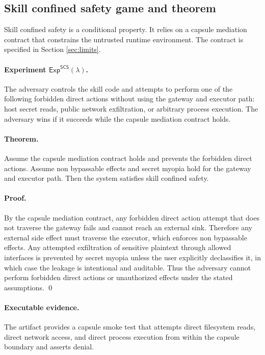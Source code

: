 \subsection{Skill confined safety game and theorem}
\label{app:proofs:scs}

Skill confined safety is a conditional property.
It relies on a capsule mediation contract that constrains the untrusted runtime environment.
The contract is specified in Section \ref{sec:limits}.

\paragraph{Experiment $\mathsf{Exp}^{\mathsf{SCS}}(\lambda)$.}
The adversary controls the skill code and attempts to perform one of the following forbidden direct
actions without using the gateway and executor path:
host secret reads, public network exfiltration, or arbitrary process execution.
The adversary wins if it succeeds while the capsule mediation contract holds.

\paragraph{Theorem.}
\begin{theorem}\label{thm:scs}
Assume the capsule mediation contract holds and prevents the forbidden direct actions.
Assume non bypassable effects and secret myopia hold for the gateway and executor path.
Then the system satisfies skill confined safety.
\end{theorem}

\paragraph{Proof.}
By the capsule mediation contract, any forbidden direct action attempt that does not traverse the
gateway fails and cannot reach an external sink.
Therefore any external side effect must traverse the executor, which enforces non bypassable effects.
Any attempted exfiltration of sensitive plaintext through allowed interfaces is prevented by secret
myopia unless the user explicitly declassifies it, in which case the leakage is intentional and
auditable.
Thus the adversary cannot perform forbidden direct actions or unauthorized effects under the stated
assumptions.
\qed

\paragraph{Executable evidence.}
The artifact provides a capsule smoke test that attempts direct filesystem reads, direct network
access, and direct process execution from within the capsule boundary and asserts denial.
